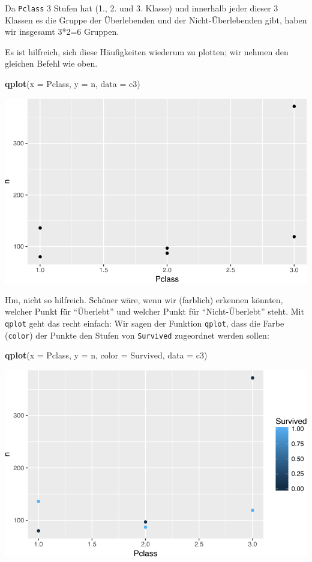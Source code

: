\documentclass[12pt,]{book}
\newenvironment{Shaded}{\begin{snugshade}}{\end{snugshade}}
\newcommand{\KeywordTok}[1]{\textcolor[rgb]{0.13,0.29,0.53}{\textbf{{#1}}}}
\newcommand{\DataTypeTok}[1]{\textcolor[rgb]{0.13,0.29,0.53}{{#1}}}
\newcommand{\NormalTok}[1]{{#1}}
\begin{document}
Da \texttt{Pclass} 3 Stufen hat (1., 2. und 3. Klasse) und innerhalb
jeder dieser 3 Klassen es die Gruppe der Überlebenden und der
Nicht-Überlebenden gibt, haben wir insgesamt 3*2=6 Gruppen.

Es ist hilfreich, sich diese Häufigkeiten wiederum zu plotten; wir
nehmen den gleichen Befehl wie oben.

\begin{Shaded}
\begin{Highlighting}[]
\KeywordTok{qplot}\NormalTok{(}\DataTypeTok{x =} \NormalTok{Pclass, }\DataTypeTok{y =} \NormalTok{n, }\DataTypeTok{data =} \NormalTok{c3)}
\end{Highlighting}
\end{Shaded}

\begin{center}\includegraphics[width=0.7\linewidth]{075_Fallstudie_Titanic_files/figure-latex/unnamed-chunk-5-1} \end{center}

Hm, nicht so hilfreich. Schöner wäre, wenn wir (farblich) erkennen
könnten, welcher Punkt für ``Überlebt'' und welcher Punkt für
``Nicht-Überlebt'' steht. Mit \texttt{qplot} geht das recht einfach: Wir
sagen der Funktion \texttt{qplot}, dass die Farbe (\texttt{color}) der
Punkte den Stufen von \texttt{Survived} zugeordnet werden sollen:

\begin{Shaded}
\begin{Highlighting}[]
\KeywordTok{qplot}\NormalTok{(}\DataTypeTok{x =} \NormalTok{Pclass, }\DataTypeTok{y =} \NormalTok{n, }\DataTypeTok{color =} \NormalTok{Survived, }\DataTypeTok{data =} \NormalTok{c3)}
\end{Highlighting}
\end{Shaded}

\begin{center}\includegraphics[width=0.7\linewidth]{075_Fallstudie_Titanic_files/figure-latex/unnamed-chunk-6-1} \end{center}
\end{document}
